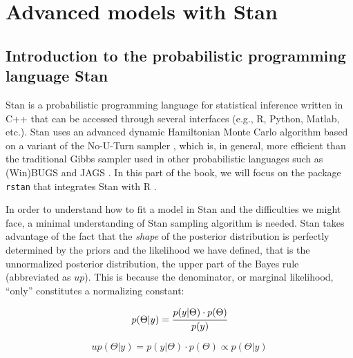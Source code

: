 \documentclass[12pt,]{krantz}
\theoremstyle{definition}
\theoremstyle{definition}
\theoremstyle{definition}
\theoremstyle{remark}
\begin{document}
\hypertarget{part-advanced-models-with-stan}{%
\part{Advanced models with Stan}\label{part-advanced-models-with-stan}}

\hypertarget{ch:introstan}{%
\chapter{Introduction to the probabilistic programming language Stan}\label{ch:introstan}}

Stan is a probabilistic programming language for statistical inference written in C++ that can be accessed through several interfaces (e.g., R, Python, Matlab, etc.). Stan uses an advanced dynamic Hamiltonian Monte Carlo algorithm \citep{betancourt2016identifying} based on a variant of the No-U-Turn sampler \citep[known as NUTS:][]{hoffmanNoUTurnSamplerAdaptively2014}, which is, in general, more efficient than the traditional Gibbs sampler used in other probabilistic languages such as (Win)BUGS \citep{lunn2000winbugs} and JAGS \citep{plummer2016jags}. In this part of the book, we will focus on the package \texttt{rstan} \citep{R-rstan} that integrates Stan \citep{carpenter2017stan} with R \citep{R-base}.

In order to understand how to fit a model in Stan and the difficulties we might face, a minimal understanding of Stan sampling algorithm is needed.
Stan takes advantage of the fact that the \emph{shape} of the posterior distribution is perfectly determined by the priors and the likelihood we have defined, that is the unnormalized posterior distribution, the upper part of the Bayes rule (abbreviated as \(up\)). This is because the denominator, or marginal likelihood, ``only'' constitutes a normalizing constant:

\begin{equation}
p(\Theta|y) = \cfrac{ p(y|\Theta) \cdot p(\Theta) }{p(y)}
\label{eq:bayesagain}
\end{equation}

\begin{equation}
up(\Theta|y) = p(y|\Theta) \cdot p(\Theta) \propto p(\Theta|y)
\label{eq:bayesagain}
\end{equation}
\end{document}
